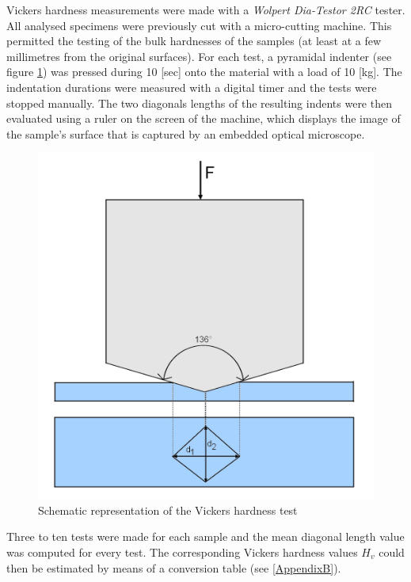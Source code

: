Vickers hardness measurements were made with a \textit{Wolpert Dia-Testor 2RC} tester. All analysed specimens were previously cut with a micro-cutting machine. This permitted the testing of the bulk hardnesses of the samples (at least at a few millimetres from the original surfaces). For each test, a pyramidal indenter (see figure \ref{fig:Vick}) was pressed during 10 [sec] onto the material with a load of 10 [kg]. The indentation durations were measured with a digital timer and the tests were stopped manually. The two diagonals lengths of the resulting indents were then evaluated using a ruler on the screen of the machine, which displays the image of the sample's surface that is captured by an embedded optical microscope.\\

\begin{figure}[ht]
\centering
\centerline{\includegraphics[scale=0.29]{Images/Vickers}}
\decoRule
\caption[Schematic representation of the Vickers hardness test]{Schematic representation of the Vickers hardness test}
\label{fig:Vick}
\end{figure}

Three to ten tests were made for each sample and the mean diagonal length value was computed for every test. The corresponding Vickers hardness values $H_v$ could then be estimated by means of a conversion table (see \ref{AppendixB}).\\

